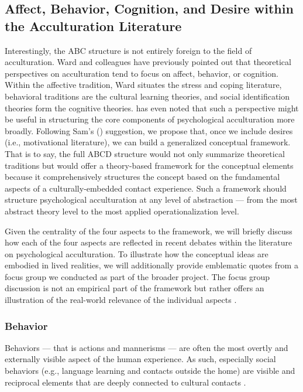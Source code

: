 \documentclass[man, 12pt, a4paper, mask]{apa7}
\begin{document}
\subsection{Affect, Behavior, Cognition, and Desire within the Acculturation Literature}
Interestingly, the ABC structure is not entirely foreign to the field of acculturation. Ward and colleagues \citep{Ward2001, Masgoret2006, Ward2019} have previously pointed out that theoretical perspectives on acculturation tend to focus on affect, behavior, or cognition. Within the affective tradition, Ward situates the stress and coping literature, behavioral traditions are the cultural learning theories, and social identification theories form the cognitive theories. \citet{Sam2006b} has even noted that such a perspective might be useful in structuring the core components of psychological acculturation more broadly. 
Following Sam's (\citeyear{Sam2006b}) suggestion, we propose that, once we include desires (i.e., motivational literature), we can build a generalized conceptual framework. That is to say, the full ABCD structure would not only summarize theoretical traditions but would offer a theory-based framework for the conceptual elements because it comprehensively structures the concept based on the fundamental aspects of a culturally-embedded contact experience. Such a framework should structure psychological acculturation at any level of abstraction --- from the most abstract theory level to the most applied operationalization level. 

Given the centrality of the four aspects to the framework, we will briefly discuss how each of the four aspects are reflected in recent debates within the literature on psychological acculturation. To illustrate how the conceptual ideas are embodied in lived realities, we will additionally provide emblematic quotes from a focus group we conducted as part of the broader project. The focus group discussion is not an empirical part of the framework but rather offers an illustration of the real-world relevance of the individual aspects \citep[the full account of the focus group discussion is available as a separate publication by ][]{kreienkamp2023Blinded}.

\subsubsection{Behavior}
Behaviors --- that is actions and mannerisms --- are often the most overtly and externally visible aspect of the human experience. As such, especially social behaviors (e.g., language learning and contacts outside the home) are visible and reciprocal elements that are deeply connected to cultural contacts \citep[e.g.,][]{Legare2019, Whiting1980, imai2016}.
\end{document}
